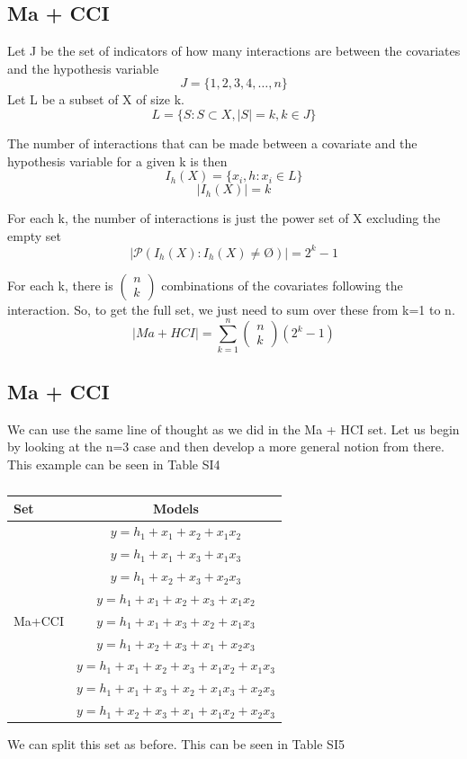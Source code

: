 \subsection{Ma + CCI}

Let J be the set of indicators of how many interactions are between the covariates and the hypothesis variable 
\[J=\{\left.1,2,3,4,\dots ,n\right.\}\] 
Let L be a subset of X of size k.
\[L=\{\left.S:S\subset X,\left|S\right|=k,k\in J\right.\}\] 

The number of interactions that can be made between a covariate and the hypothesis variable for a given k is then
\[I_h\left(X\right)=\{\left.\left.x_i,h\right.:x_i\in L\right.\}\] 
\[\left|I_h\left(X\right)\right|=k\] 

For each k, the number of interactions is just the power set of X excluding the empty set
\[\left|\mathcal{P}\left(I_h\left(X\right):I_h\left(X\right)\neq \textrm{\O}\right)\right|=2^k-1\] 

For each k, there is $\left( \begin{array}{c}
n \\ 
k \end{array}
\right)$ combinations of the covariates following the interaction. So, to get the full set, we just need to sum over these from k=1 to n.
\[\left|Ma+HCI\right|=\sum^n_{k=1}{\left( \begin{array}{c}
n \\ 
k \end{array}
\right)\left(2^k-1\right)}\] 
\textbf{}

\subsection{Ma + CCI}

We can use the same line of thought as we did in the Ma + HCI set. Let us begin by looking at the n=3 case and then develop a more general notion from there. This example can be seen in Table SI4 
\begin{table}
\centering
\caption{}
\begin{tabular}{lc} \hline 
\toprule
Set & Models \\
\midrule
\multirow{9}{*}{Ma+CCI} & $y=h_1+x_1+x_2+x_1x_2$\\ & $y=h_1+x_1+x_3+x_1x_3$\\ & $y=h_1+x_2+x_3+x_2x_3$\\ & $y=h_1+x_1+x_2+x_3+x_1x_2$\\ & $y=h_1+x_1+x_3+x_2+x_1x_3$\\ & $y=h_1+x_2+x_3+x_1+x_2x_3$\\ & $y=h_1+x_1+x_2+x_3+x_1x_2+x_1x_3$\\ & $y=h_1+x_1+x_3+x_2+x_1x_3+x_2x_3$\\ & $y=h_1+x_2+x_3+x_1+x_1x_2+x_2x_3$ \\
\bottomrule
\end{tabular}
\end{table}
We can split this set as before. This can be seen in Table SI5

